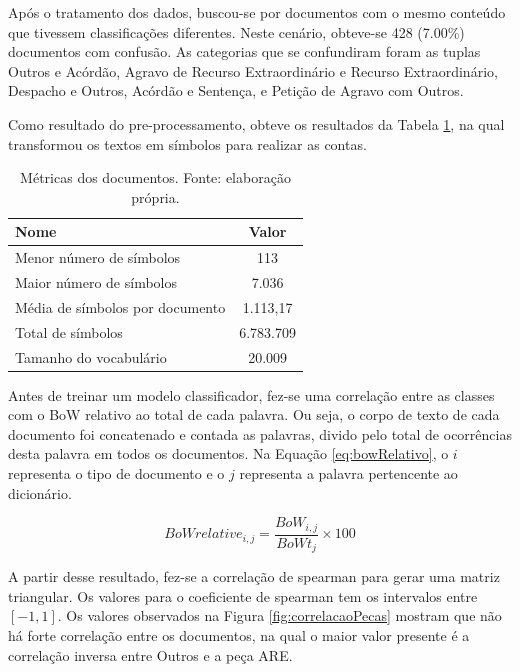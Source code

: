 Após o tratamento dos dados, buscou-se por documentos com o mesmo conteúdo que tivessem classificações diferentes. Neste cenário, obteve-se 428 (7.00\%) documentos com confusão. As categorias que se confundiram foram as tuplas Outros e Acórdão, Agravo de Recurso Extraordinário e Recurso Extraordinário, Despacho e Outros, Acórdão e Sentença, e Petição de Agravo com Outros.

Como resultado do pre-processamento, obteve os resultados da Tabela \ref{tab:simbolos}, na qual transformou os textos em símbolos para realizar as contas.

\begin{table}[h]
	\centering    
	\caption{Métricas dos documentos. Fonte: elaboração própria.}
    \label{tab:simbolos}
	\begin{tabular}{|l|c|}
    \hline
    \textbf{Nome} & \textbf{Valor} \\ 
    \hline
    Menor número de símbolos & 113 \\
    \hline
    Maior número de símbolos & 7.036 \\
    \hline
    Média de símbolos por documento & 1.113,17 \\
    \hline
    Total de símbolos & 6.783.709 \\
    \hline
    Tamanho do vocabulário & 20.009 \\
    \hline
    \end{tabular}
\end{table}

Antes de treinar um modelo classificador, fez-se uma correlação entre as classes com o BoW relativo ao total de cada palavra. Ou seja, o corpo de texto de cada documento foi concatenado e contada as palavras, divido pelo total de ocorrências desta palavra em todos os documentos. Na Equação \ref{eq:bowRelativo}, o $i$ representa o tipo de documento e o $j$ representa a palavra pertencente ao dicionário.

\begin{equation}
\label{eq:bowRelativo}
	BoWrelative_{i,j} = \frac{BoW_{i,j}}{BoWt_{j}} \times 100
\end{equation}

A partir desse resultado, fez-se a correlação de spearman para gerar uma matriz triangular. Os valores para o coeficiente de spearman tem os intervalos entre $[-1,1]$. Os valores observados na Figura \ref{fig:correlacaoPecas} mostram que não há forte correlação entre os documentos, na qual o maior valor presente é a correlação inversa entre Outros e a peça ARE.

